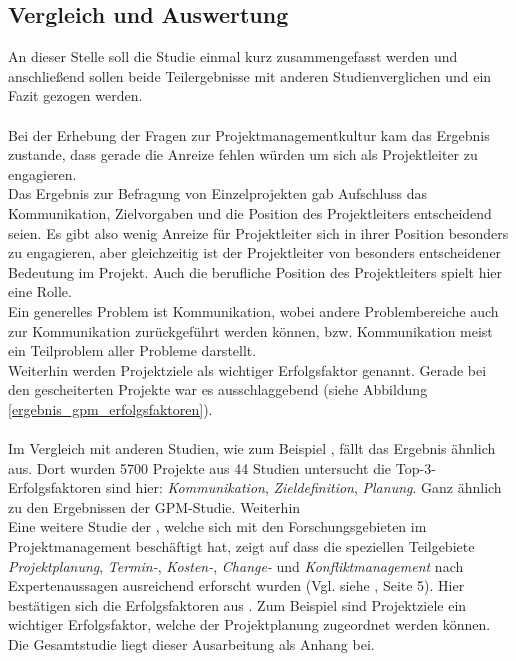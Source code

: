 \documentclass[11pt]{scrartcl}
\begin{document}
\subsection{Vergleich und Auswertung}
An dieser Stelle soll die Studie einmal kurz zusammengefasst werden und anschließend sollen beide Teilergebnisse mit anderen Studienverglichen und ein Fazit gezogen werden. \\
\\
Bei der Erhebung der Fragen zur Projektmanagementkultur kam das Ergebnis zustande, dass gerade die Anreize fehlen würden um sich als Projektleiter zu engagieren. \\
Das Ergebnis zur Befragung von Einzelprojekten gab Aufschluss das Kommunikation, Zielvorgaben und die Position des Projektleiters entscheidend seien. Es gibt also wenig Anreize für Projektleiter sich in ihrer Position besonders zu engagieren, aber gleichzeitig ist der Projektleiter von besonders entscheidener Bedeutung im Projekt. Auch die berufliche  Position des Projektleiters spielt hier eine Rolle.\\
Ein generelles Problem ist Kommunikation, wobei andere Problembereiche auch zur Kommunikation zurückgeführt werden können, bzw. Kommunikation meist ein Teilproblem aller Probleme darstellt.\\
Weiterhin werden Projektziele als wichtiger Erfolgsfaktor genannt. Gerade bei den gescheiterten Projekte war es ausschlaggebend (siehe Abbildung \ref{ergebnis_gpm_erfolgsfaktoren}).\\
\\
Im Vergleich mit anderen Studien, wie zum Beispiel \cite{euregio__studie_erfolgsfaktoren}, fällt das Ergebnis ähnlich aus. Dort wurden 5700 Projekte aus 44 Studien untersucht die Top-3-Erfolgsfaktoren sind hier: \textit{Kommunikation}, \textit{Zieldefinition}, \textit{Planung}. Ganz ähnlich zu den Ergebnissen der GPM-Studie. Weiterhin \\
Eine weitere Studie der \cite{gpm_gesamt_07_09}, welche sich mit den Forschungsgebieten im Projektmanagement beschäftigt hat, zeigt auf dass die speziellen Teilgebiete \textit{Projektplanung}, \textit{Termin-}, \textit{Kosten-}, \textit{Change-} und \textit{Konfliktmanagement} nach Expertenaussagen ausreichend erforscht wurden (Vgl. siehe \cite{gpm_gesamt_07_09}, Seite 5). Hier bestätigen sich die Erfolgsfaktoren aus \cite{GPM_Studie_2008}. Zum Beispiel sind Projektziele ein wichtiger Erfolgsfaktor, welche der Projektplanung zugeordnet werden können. Die Gesamtstudie liegt dieser Ausarbeitung als Anhang bei. \\
\end{document}
